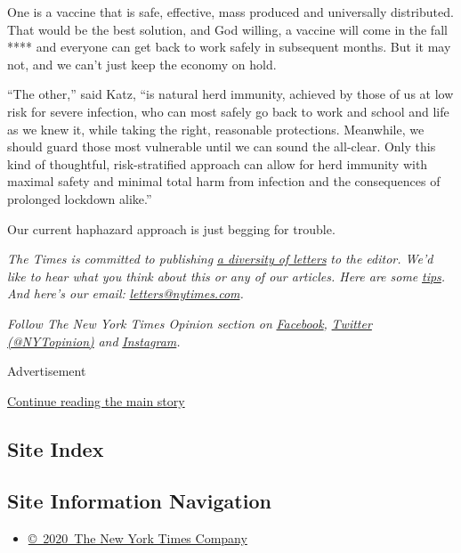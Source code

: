 One is a vaccine that is safe, effective, mass produced and universally
distributed. That would be the best solution, and God willing, a vaccine
will come in the fall **** and everyone can get back to work safely in
subsequent months. But it may not, and we can't just keep the economy on
hold.

``The other,'' said Katz, ``is natural herd immunity, achieved by those
of us at low risk for severe infection, who can most safely go back to
work and school and life as we knew it, while taking the right,
reasonable protections. Meanwhile, we should guard those most vulnerable
until we can sound the all-clear. Only this kind of thoughtful,
risk-stratified approach can allow for herd immunity with maximal safety
and minimal total harm from infection and the consequences of prolonged
lockdown alike.''

Our current haphazard approach is just begging for trouble.

\emph{The Times is committed to publishing}
\href{https://www.nytimes.com/2019/01/31/opinion/letters/letters-to-editor-new-york-times-women.html}{\emph{a
diversity of letters}} \emph{to the editor. We'd like to hear what you
think about this or any of our articles. Here are some}
\href{https://help.nytimes.com/hc/en-us/articles/115014925288-How-to-submit-a-letter-to-the-editor}{\emph{tips}}\emph{.
And here's our email:}
\href{mailto:letters@nytimes.com}{\emph{letters@nytimes.com}}\emph{.}

\emph{Follow The New York Times Opinion section on}
\href{https://www.facebook.com/nytopinion}{\emph{Facebook}}\emph{,}
\href{http://twitter.com/NYTOpinion}{\emph{Twitter (@NYTopinion)}}
\emph{and}
\href{https://www.instagram.com/nytopinion/}{\emph{Instagram}}\emph{.}

Advertisement

\protect\hyperlink{after-bottom}{Continue reading the main story}

\hypertarget{site-index}{%
\subsection{Site Index}\label{site-index}}

\hypertarget{site-information-navigation}{%
\subsection{Site Information
Navigation}\label{site-information-navigation}}

\begin{itemize}
\tightlist
\item
  \href{https://help.nytimes.com/hc/en-us/articles/115014792127-Copyright-notice}{©~2020~The
  New York Times Company}
\end{itemize}

